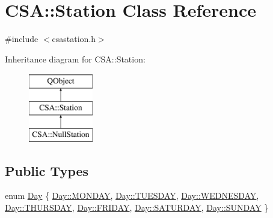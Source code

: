\hypertarget{classCSA_1_1Station}{}\section{C\+SA\+:\+:Station Class Reference}
\label{classCSA_1_1Station}


{\ttfamily \#include $<$csastation.\+h$>$}

Inheritance diagram for C\+SA\+:\+:Station\+:\begin{figure}[H]
\begin{center}
\leavevmode
\includegraphics[height=3.000000cm]{classCSA_1_1Station}
\end{center}
\end{figure}
\subsection*{Public Types}
\begin{DoxyCompactItemize}
\item 
enum \mbox{\hyperlink{classCSA_1_1Station_aa160d0de40db0583099b5986dea1cd67}{Day}} \{ \newline
\mbox{\hyperlink{classCSA_1_1Station_aa160d0de40db0583099b5986dea1cd67a98617021b249af0ace0f84ee92ccc7cd}{Day\+::\+M\+O\+N\+D\+AY}}, 
\mbox{\hyperlink{classCSA_1_1Station_aa160d0de40db0583099b5986dea1cd67a5f5140afce13197a89e848004f292f14}{Day\+::\+T\+U\+E\+S\+D\+AY}}, 
\mbox{\hyperlink{classCSA_1_1Station_aa160d0de40db0583099b5986dea1cd67aaaebdc947e9f7d4ea362e5dc4fe7f825}{Day\+::\+W\+E\+D\+N\+E\+S\+D\+AY}}, 
\mbox{\hyperlink{classCSA_1_1Station_aa160d0de40db0583099b5986dea1cd67a7a61b324afb4dd8b2fb4a38afc34f755}{Day\+::\+T\+H\+U\+R\+S\+D\+AY}}, 
\newline
\mbox{\hyperlink{classCSA_1_1Station_aa160d0de40db0583099b5986dea1cd67a86fb6d343289267f3e9edb9b7403d936}{Day\+::\+F\+R\+I\+D\+AY}}, 
\mbox{\hyperlink{classCSA_1_1Station_aa160d0de40db0583099b5986dea1cd67afd5ae113ac00b67f69541bc8c7f21ef7}{Day\+::\+S\+A\+T\+U\+R\+D\+AY}}, 
\mbox{\hyperlink{classCSA_1_1Station_aa160d0de40db0583099b5986dea1cd67a95fa12cb2100ce7081b71f7c44bc12a5}{Day\+::\+S\+U\+N\+D\+AY}}
 \}
\end{DoxyCompactItemize}
